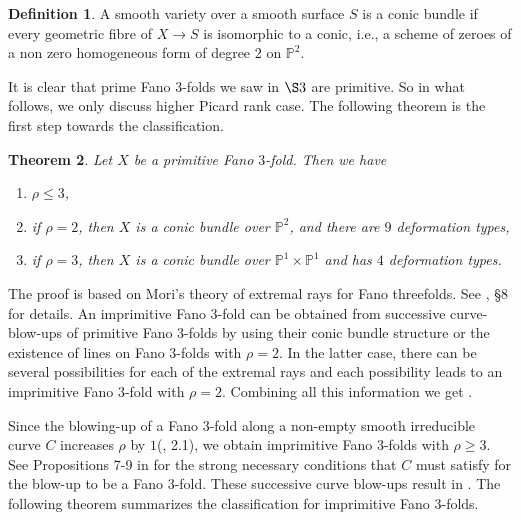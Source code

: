 \documentclass[11pt]{amsart}
\theoremstyle{plain}
\newtheorem{theorem}{Theorem}[section]
\theoremstyle{definition}
\newtheorem{definition}[theorem]{Definition}
\theoremstyle{expl}
\begin{document}
	\begin{definition}
	    A smooth variety over a smooth surface $S$ is a conic bundle if every geometric fibre of $X \to S$ is isomorphic to a conic, i.e., a scheme of zeroes of a non zero homogeneous form of degree $2$ on $\mathbb{P}^2$.
	\end{definition}
    It is clear that prime Fano $3$-folds we saw in $\S 3$ are primitive. So in what follows, we only discuss higher Picard rank case. The following theorem is the first step towards the classification.
    \begin{theorem}
    	Let $X$ be a primitive Fano $3$-fold. Then we have 
    	\begin{enumerate}
    		\item $\rho \leq 3$,
		\item if $\rho =2$, then $X$ is a conic bundle over $\mathbb{P}^2$, and there are $9$ deformation types, 
    		\item if $\rho =3$, then $X$ is a conic bundle over $\mathbb{P}^1 \times \mathbb{P}^1$ and has $4$ deformation types. 
    	\end{enumerate}
    \end{theorem}
    The proof is based on Mori's theory of extremal rays for Fano threefolds. See \cite{MM83}, \S8 for details.
    \medbreak
    An imprimitive Fano $3$-fold can be obtained from successive curve-blow-ups of primitive Fano $3$-folds by using their conic bundle structure or the existence of lines on Fano $3$-folds with $\rho=2$. In the latter case, there can be several possibilities for each of the extremal rays and each possibility leads to an imprimitive Fano $3$-fold with $\rho=2$. Combining all this information we get \cite[Table 2]{MM81}.
    
    Since the blowing-up of a Fano $3$-fold along a non-empty smooth irreducible curve $C$ increases $\rho$ by $1$(\cite{MM85}, 2.1), we obtain imprimitive Fano $3$-folds with $\rho \geq 3$. See Propositions 7-9 in \cite{MM81} for the strong necessary conditions that $C$ must satisfy for the blow-up to be a Fano $3$-fold. These successive curve blow-ups result in \cite[Tables 3-5]{MM81}.
    \medbreak
    The following theorem summarizes the classification for imprimitive Fano $3$-folds. 
    
\end{document}
